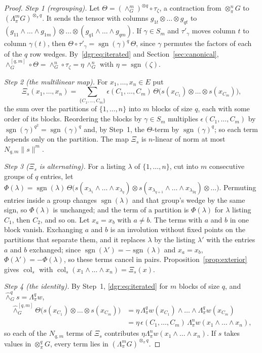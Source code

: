 \documentclass[11pt]{amsart}
\theoremstyle{definition}
\theoremstyle{remark}
\numberwithin{equation}{section}
\newcommand{\sgn}{\operatorname{sgn}}
\newcommand{\norm}[1]{\lVert #1\rVert}
\theoremstyle{plain}
\theoremstyle{definition}
\theoremstyle{plain}
\begin{document}
\begin{proof}
\emph{Step 1 (regrouping).} Let $\Theta=(\wedge^m_G)^{\otimes q}\circ\tau_\zeta$, a contraction from $\otimes^n_\pi G$
to $(\Lambda^m_\pi G)^{\otimes_\pi q}$. It sends the tensor with columns $g_{1t}\otimes\dots\otimes g_{qt}$ to
$(g_{11}\wedge\dots\wedge g_{1m})\otimes\dots\otimes(g_{q1}\wedge\dots\wedge g_{qm})$. If $\gamma\in S_m$ and
$\tau'_\gamma$ moves column $t$ to column $\gamma(t)$, then $\Theta\circ\tau'_\gamma=\sgn(\gamma)^q\,\Theta$, since $\gamma$
permutes the factors of each of the $q$ row wedges. By~\eqref{dgr:eq:iterated} and Section~\ref{sec:canonical},
$\wedge^{[q,m]}_G\circ\Theta=\wedge^n_G\circ\tau_\zeta=\eta\,\wedge^n_G$ with $\eta=\sgn(\zeta)$.

\emph{Step 2 (the multilinear map).} For $x_1,\dots,x_n\in E$ put
\[
 \Xi_s(x_1,\dots,x_n)=\sum_{\{C_1,\dots,C_m\}}\epsilon(C_1,\dots,C_m)\,
 \Theta\bigl(s(x_{C_1})\otimes\dots\otimes s(x_{C_m})\bigr),
\]
the sum over the partitions of $\{1,\dots,n\}$ into $m$ blocks of size $q$, each with some order of its blocks.
Reordering the blocks by $\gamma\in S_m$ multiplies $\epsilon(C_1,\dots,C_m)$ by $\sgn(\gamma)^{q^2}=\sgn(\gamma)^q$ and,
by Step~1, the $\Theta$-term by $\sgn(\gamma)^q$; so each term depends only on the partition. The map $\Xi_s$ is
$n$-linear of norm at most $N_{q,m}\norm s^m$.

\emph{Step 3 ($\Xi_s$ is alternating).} For a listing $\lambda$ of $\{1,\dots,n\}$, cut into $m$ consecutive groups of $q$
entries, let $\Phi(\lambda)=\sgn(\lambda)\,\Theta\bigl(s(x_{\lambda_1}\wedge\dots\wedge x_{\lambda_q})\otimes
s(x_{\lambda_{q+1}}\wedge\dots\wedge x_{\lambda_{2q}})\otimes\dots\bigr)$. Permuting entries inside a group changes
$\sgn(\lambda)$ and that group's wedge by the same sign, so $\Phi(\lambda)$ is unchanged; and the term of a partition is
$\Phi(\lambda)$ for $\lambda$ listing $C_1$, then $C_2$, and so on. Let $x_a=x_b$ with $a\ne b$. The terms with $a$ and
$b$ in one block vanish. Exchanging $a$ and $b$ is an involution without fixed points on the partitions that separate
them, and it replaces $\lambda$ by the listing $\lambda'$ with the entries $a$ and $b$ exchanged; since
$\sgn(\lambda')=-\sgn(\lambda)$ and $x_a=x_b$, $\Phi(\lambda')=-\Phi(\lambda)$, so these terms cancel in pairs.
Proposition~\ref{prop:exterior} gives $\operatorname{col}_s$ with $\operatorname{col}_s(x_1\wedge\dots\wedge x_n)=\Xi_s(x)$.

\emph{Step 4 (the identity).} By Step~1, \eqref{dgr:eq:iterated} for $m$ blocks of size $q$, and
$\widehat\wedge^q_Gs=\Lambda^q_\pi w$,
\[
\begin{aligned}
 \widehat\wedge^{[q,m]}_G\Theta\bigl(s(x_{C_1})\otimes\dots\otimes s(x_{C_m})\bigr)
 &=\eta\,\Lambda^q_\pi w(x_{C_1})\wedge\dots\wedge\Lambda^q_\pi w(x_{C_m})\\
 &=\eta\,\epsilon(C_1,\dots,C_m)\,\Lambda^n_\pi w(x_1\wedge\dots\wedge x_n),
\end{aligned}
\]
so each of the $N_{q,m}$ terms of $\Xi_s$ contributes $\eta\Lambda^n_\pi w(x_1\wedge\dots\wedge x_n)$. If $s$ takes values
in $\otimes^q_\pi G$, every term lies in $(\Lambda^m_\pi G)^{\otimes_\pi q}$.
\end{proof}
\end{document}
